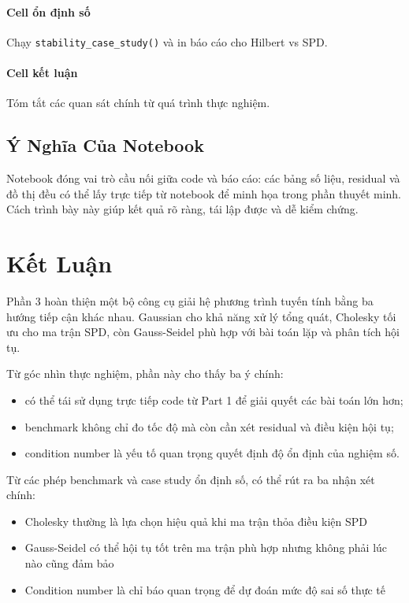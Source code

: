 \documentclass[12pt, a4paper, twoside]{article}
\begin{document}
\paragraph{Cell ổn định số}
Chạy \texttt{stability\_case\_study()} và in báo cáo cho Hilbert vs SPD.

\paragraph{Cell kết luận}
Tóm tắt các quan sát chính từ quá trình thực nghiệm.

\subsection{Ý Nghĩa Của Notebook}

Notebook đóng vai trò cầu nối giữa code và báo cáo: các bảng số liệu, residual và đồ thị đều có thể lấy trực tiếp từ notebook để minh họa trong phần thuyết minh. Cách trình bày này giúp kết quả rõ ràng, tái lập được và dễ kiểm chứng.

\section{Kết Luận}

Phần 3 hoàn thiện một bộ công cụ giải hệ phương trình tuyến tính bằng ba hướng tiếp cận khác nhau. Gaussian cho khả năng xử lý tổng quát, Cholesky tối ưu cho ma trận SPD, còn Gauss-Seidel phù hợp với bài toán lặp và phân tích hội tụ.

Từ góc nhìn thực nghiệm, phần này cho thấy ba ý chính:
\begin{itemize}
    \item có thể tái sử dụng trực tiếp code từ Part 1 để giải quyết các bài toán lớn hơn;
    \item benchmark không chỉ đo tốc độ mà còn cần xét residual và điều kiện hội tụ;
    \item condition number là yếu tố quan trọng quyết định độ ổn định của nghiệm số.
\end{itemize}

Từ các phép benchmark và case study ổn định số, có thể rút ra ba nhận xét chính:
\begin{itemize}
    \item Cholesky thường là lựa chọn hiệu quả khi ma trận thỏa điều kiện SPD
    \item Gauss-Seidel có thể hội tụ tốt trên ma trận phù hợp nhưng không phải lúc nào cũng đảm bảo
    \item Condition number là chỉ báo quan trọng để dự đoán mức độ sai số thực tế
\end{itemize}
\end{document}
